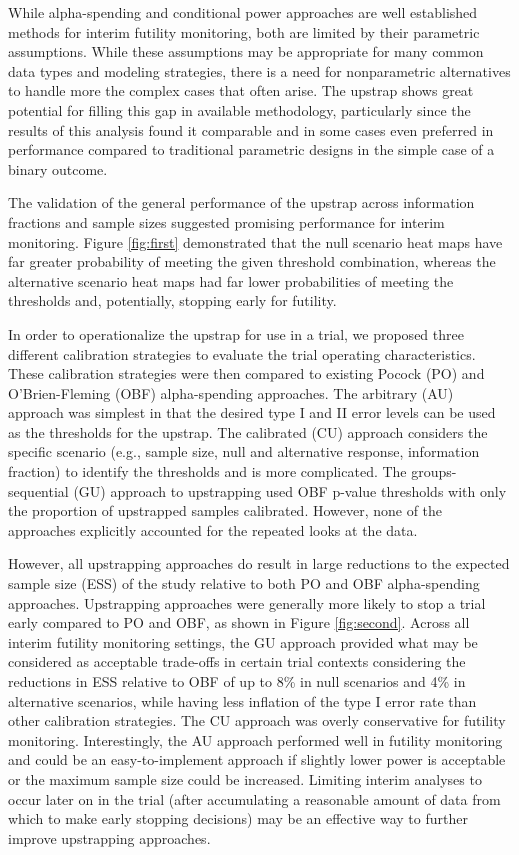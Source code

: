 \documentclass[Afour,sageh,times,square,numbers]{sagej}
\begin{document}
While alpha-spending and conditional power approaches are well established methods for interim futility monitoring, both are limited by their parametric assumptions.  While these assumptions may be appropriate for many common data types and modeling strategies, there is a need for nonparametric alternatives to handle more the complex cases that often arise.  The upstrap shows great potential for filling this gap in available methodology, particularly since the results of this analysis found it comparable and in some cases even preferred in performance compared to traditional parametric designs in the simple case of a binary outcome.

The validation of the general performance of the upstrap across information fractions and sample sizes suggested promising performance for interim monitoring. Figure \ref{fig:first} demonstrated that the null scenario heat maps have far greater probability of meeting the given threshold combination, whereas the alternative scenario heat maps had far lower probabilities of meeting the thresholds and, potentially, stopping early for futility. 

In order to operationalize the upstrap for use in a trial, we proposed three different calibration strategies to evaluate the trial operating characteristics. These calibration strategies were then compared to existing Pocock (PO) and O'Brien-Fleming (OBF) alpha-spending approaches. The arbitrary (AU) approach was simplest in that the desired type I and II error levels can be used as the thresholds for the upstrap. The calibrated (CU) approach considers the specific scenario (e.g., sample size, null and alternative response, information fraction) to identify the thresholds and is more complicated. The groups-sequential (GU) approach to upstrapping used OBF p-value thresholds with only the proportion of upstrapped samples calibrated. However, none of the approaches explicitly accounted for the repeated looks at the data.

However, all upstrapping approaches do result in large reductions to the expected sample size (ESS) of the study relative to both PO and OBF alpha-spending approaches. Upstrapping approaches were generally more likely to stop a trial early compared to PO and OBF, as shown in Figure \ref{fig:second}.  Across all interim futility monitoring settings, the GU approach provided what may be considered as acceptable trade-offs in certain trial contexts considering the reductions in ESS relative to OBF of up to 8\% in null scenarios and 4\% in alternative scenarios, while having less inflation of the type I error rate than other calibration strategies. The CU approach was overly conservative for futility monitoring. Interestingly, the AU approach performed well in futility monitoring and could be an easy-to-implement approach if slightly lower power is acceptable or the maximum sample size could be increased.  Limiting interim analyses to occur later on in the trial (after accumulating a reasonable amount of data from which to make early stopping decisions) may be an effective way to further improve upstrapping approaches.
\end{document}

